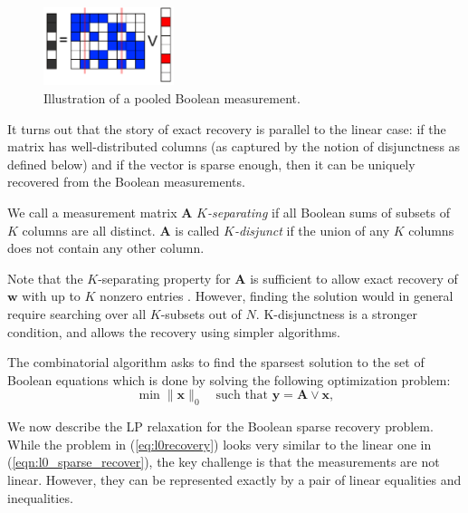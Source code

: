 \begin{figure}[!thb]
\centering
\includegraphics[width=1.5in]{./fig_group_test.pdf}
\caption{  Illustration of a pooled Boolean measurement.}
\label{fig:group_testing}
\end{figure}

It turns out that the story of exact recovery is parallel to the linear case: 
if the matrix has well-distributed columns (as captured by the notion of disjunctness as defined below) and if the vector is sparse enough, then it can be uniquely recovered from the 
Boolean measurements. 

\begin{definition}
We call a measurement matrix $\mathbf{A}$ {\em $K$-separating} 
if all Boolean sums of subsets of $K$ columns are all distinct. 
$\mathbf{A}$ is called {\em $K$-disjunct} if the union of any 
$K$ columns does not contain any other column.
\end{definition}

Note that the $K$-separating property for $\mathbf{A}$ is sufficient 
to allow exact recovery of $\mathbf{w}$ with up to $K$ nonzero entries 
\cite{book2_group_testing}. However, finding the solution would 
in general require searching over all $K$-subsets out of $N$. K-disjunctness
is a stronger condition, and allows the recovery using simpler algorithms. 

The combinatorial algorithm asks to find the sparsest solution to the 
set of Boolean equations which is done by solving the following optimization problem:
\begin{equation}
\label{eq:l0recovery}
	\min \|\mathbf{x}\|_0 \quad {\textrm{such that }}\mathbf{y} = \mathbf{A} \lor \mathbf{x},
\end{equation}

We now describe the LP relaxation for the Boolean sparse recovery problem. While
the problem in (\ref{eq:l0recovery}) looks very similar to the linear one in 
(\ref{eqn:l0_sparse_recover}), the key challenge is that the measurements are not linear. However, they can be represented exactly by a pair of linear equalities and inequalities. 

